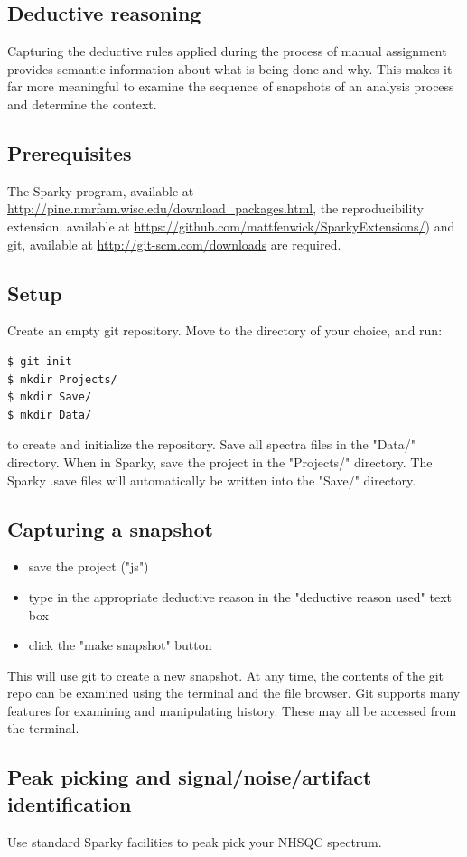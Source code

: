 \subsection{Deductive reasoning}
Capturing the deductive rules applied during the process of manual assignment
provides semantic information about what is being done and why.  This makes it
far more meaningful to examine the sequence of snapshots of an analysis
process and determine the context.

\subsection{Prerequisites}
The Sparky program, available at 
\url{http://pine.nmrfam.wisc.edu/download_packages.html}, 
the reproducibility extension, available at 
\url{https://github.com/mattfenwick/SparkyExtensions/})
and git, available at \url{http://git-scm.com/downloads}
are required.

\subsection{Setup}
Create an empty git repository.  Move to the directory of your choice, and
run:
\begin{verbatim}
$ git init
$ mkdir Projects/
$ mkdir Save/
$ mkdir Data/
\end{verbatim} 
to create and initialize the repository.  
Save all spectra files in the "Data/" directory.
When in Sparky, save the project in the "Projects/" directory.
The Sparky .save files will automatically be written into the "Save/"
directory.

\subsection{Capturing a snapshot}
\begin{itemize}
  \item save the project ("js")
  \item type in the appropriate deductive reason in the "deductive reason used"
    text box
  \item click the "make snapshot" button
\end{itemize}
This will use git to create a new snapshot.  At any time, the contents of
the git repo can be examined using the terminal and the file browser.  Git
supports many features for examining and manipulating history.  These may
all be accessed from the terminal.

\subsection{Peak picking and signal/noise/artifact identification}
Use standard Sparky facilities to peak pick your NHSQC spectrum.


